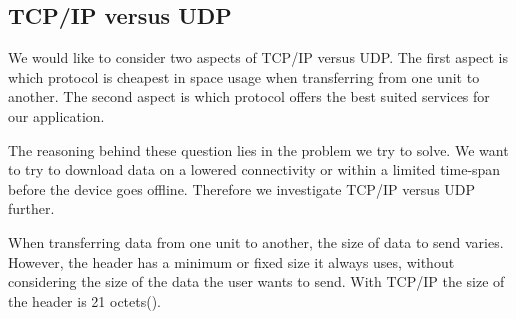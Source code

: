 \subsection{TCP/IP versus UDP}
We would like to consider two aspects of TCP/IP versus UDP. The first aspect is which protocol is cheapest in space usage when transferring from one unit to another. The second aspect is which protocol offers the best suited services for our application.

The reasoning behind these question lies in the problem we try to solve. We want to try to download data on a lowered connectivity or within a limited time-span before the device goes offline. Therefore we investigate TCP/IP versus UDP further.

When transferring data from one unit to another, the size of data to send varies. However, the header has a minimum or fixed size it always uses, without considering the size of the data the user wants to send. With TCP/IP the size of the header is 21 octets(\cite{tcpdesc}). 
\cite{udpdesc}